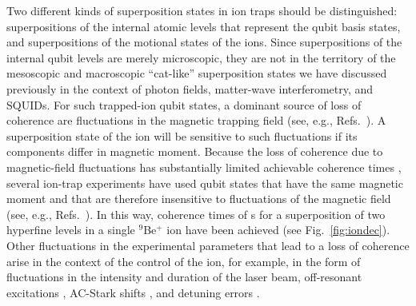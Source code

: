 \documentclass[3p,sort&compress]{elsarticle}
\begin{document}
Two different kinds of superposition states in ion traps should be distinguished: superpositions of the internal atomic levels that represent the qubit basis states, and superpositions of the motional states of the ions. Since superpositions of the internal qubit levels are merely microscopic, they are not in the territory of the mesoscopic and macroscopic ``cat-like'' superposition states we have discussed previously in the context of photon fields, matter-wave interferometry, and SQUIDs. For such trapped-ion qubit states, a dominant source of loss of coherence are fluctuations in the magnetic trapping field (see, e.g., Refs.~\cite{SchmidtKaler:2003:pp,Brouard:2004:in,Grotz:2006:km, Haffner:2008:pp}). A superposition state of the ion will be sensitive to such fluctuations if its components differ in magnetic moment. Because the loss of coherence due to magnetic-field fluctuations has substantially limited achievable coherence times \cite{Haffner:2008:pp}, several ion-trap experiments have used qubit states that have the same magnetic moment and that are therefore insensitive to fluctuations of the magnetic field (see, e.g., Refs.~\cite{Haljan:2005:oo,Langer:2005:uu,Benhelm:2008:oo}). In this way, coherence times of \unit[10]{s} for a superposition of two hyperfine levels in a single $^9$Be$^+$ ion have been achieved \cite{Langer:2005:uu} (see Fig.~\ref{fig:iondec}). Other fluctuations in the experimental parameters that lead to a loss of coherence arise in the context of the control of the ion, for example, in the form of fluctuations in the intensity \cite{Schneider:1998:yz} and duration \cite{Miquel:1997:zz} of the laser beam, off-resonant excitations \cite{Steane:2000:ii}, AC-Stark shifts \cite{Haffner:2003:oo}, and detuning errors \cite{Leibfried:2003:mm}.
\end{document}
